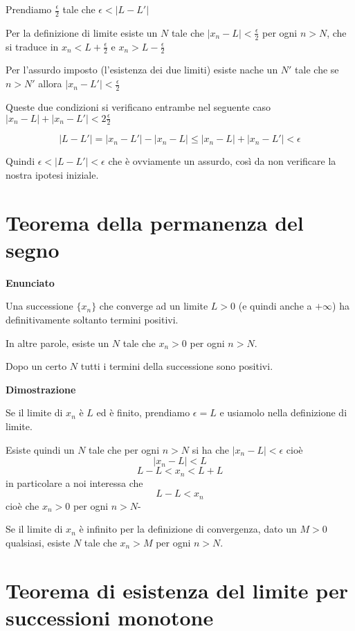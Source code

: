 Prendiamo $\frac{\epsilon}{2}$ tale che $\epsilon < |L-L'|$

Per la definizione di limite esiste un $N$ tale che $|x_{n}-L| < \frac{\epsilon}{2}$ per ogni $n > N$, che si traduce in $x_{n} < L + \frac{\epsilon}{2}$ e $x_{n} > L - \frac{\epsilon}{2}$

Per l'assurdo imposto (l'esistenza dei due limiti) esiste nache un $N'$ tale che se $n > N'$ allora $|x_{n}-L'| < \frac{\epsilon}{2}$

Queste due condizioni si verificano entrambe nel seguente caso $|x_{n}-L| + |x_{n}-L'| < 2\frac{\epsilon}{2}$

$$|L-L'| = |x_{n}-L'| - |x_{n}-L| \leq |x_{n}-L| + |x_{n}-L'| < \epsilon$$

Quindi $\epsilon < |L-L'| < \epsilon$ che è ovviamente un assurdo, così da non verificare la nostra ipotesi iniziale.


\section{Teorema della permanenza del segno}


\textbf{Enunciato}

Una successione $\{x_{n}\}$ che converge ad un limite $L > 0$ (e quindi anche a $+\infty$) ha definitivamente soltanto termini positivi.

\begin{tip}
In altre parole, esiste un $N$ tale che $x_{n}>0$ per ogni $n > N$. 

Dopo un certo $N$ tutti i termini della successione sono positivi.
\end{tip}

\textbf{Dimostrazione}

Se il limite di $x_{n}$ è $L$ ed è finito, prendiamo $\epsilon = L$ e usiamolo nella definizione di limite.

Esiste quindi un $N$ tale che per ogni $n > N$ si ha che $|x_{n}-L| < \epsilon$ cioè
$$|x_{n}-L| < L$$
$$L - L < x_{n} < L + L$$
in particolare a noi interessa che 
$$L - L < x_{n}$$
cioè che $x_{n}>0$ per ogni $n > N$-

Se il limite di $x_{n}$ è infinito per la definizione di convergenza, dato un $M > 0$ qualsiasi, esiste $N$ tale che $x_{n}>M$ per ogni $n>N$.

\section{Teorema di esistenza del limite per successioni monotone}

